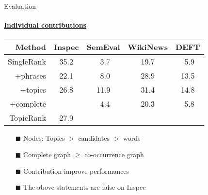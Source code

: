   \begin{frame}[label=contributions_evaluation]{Evaluation}
    \framesubtitle{\hyperlink{contributions_evaluation_backup}{Individual contributions}}
    
    \begin{center}
      \begin{tabular}{rcccc}
        \toprule
        \textbf{Method} & \textbf{Inspec} & \textbf{SemEval} & \textbf{WikiNews} & \textbf{DEFT}\\
        \midrule
        SingleRank & 35.2 & $~~$3.7 & 19.7 & $~~$5.9\\
        \midrule
        +phrases & 22.1 & $~~$8.0 & 28.9 & 13.5\\
        +topics & 26.8 & 11.9 & 31.4 & 14.8\\
        +complete &  \cellcolor{pink}{35.5} & $~~$4.4 & 20.3 & $~~$5.8\\
        \midrule
        TopicRank & 27.9 & \cellcolor{pink}{12.1} & \cellcolor{pink}{35.6} & \cellcolor{pink}{15.1}\\
        \bottomrule
      \end{tabular}
    \end{center}

    \begin{itemize}
      \item[\footnotesize\color{green}$\blacksquare$]{Nodes: Topics $>$
                                                      candidates $>$ words}
      \item[\footnotesize\color{green}$\blacksquare$]{Complete graph $\geq$
                                                      co-occurrence graph}
      \item[\footnotesize\color{green}$\blacksquare$]{Contribution improve
                                                      performances}
      \item[\footnotesize\color{red}$\blacksquare$]{The above statements are
                                                    false on Inspec}
    \end{itemize}
  \end{frame}

